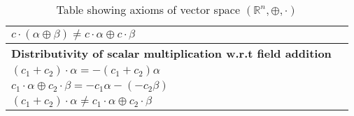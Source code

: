 \documentclass[journal,12pt,twocolumn]{IEEEtran}
\begin{document}
\begin{table}[h!]
\begin{center}
\begin{tabular}{|p{3.8cm}|p{3.8cm}|}
$c\cdot(\alpha\oplus\beta)\neq c\cdot\alpha\oplus c\cdot\beta$&\\[0.5ex]\hline
\textbf{Distributivity of scalar multiplication w.r.t field addition}&\\
$(c_1+c_2)\cdot\alpha=-(c_1+c_2)\alpha$&\\
$c_1\cdot\alpha\oplus c_2\cdot\beta=-c_1\alpha-(-c_2\beta)$&\\
$(c_1+c_2)\cdot\alpha\neq c_1\cdot\alpha\oplus c_2\cdot\beta$&\\[0.5ex]\hline
\end{tabular}
\caption{Table showing axioms of vector space $(\mathbb{R}^n,\oplus,\cdot)$ }
\label{table:1}
\end{center}
\vspace{-0.5cm}
\end{table}
\end{document}
